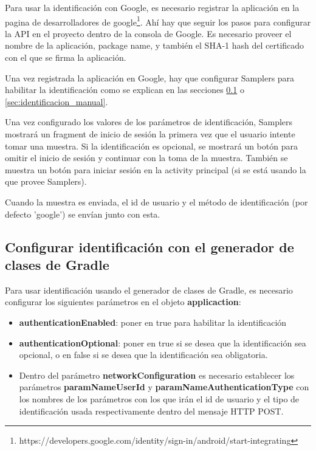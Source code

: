 Para usar la identificación con Google, es necesario registrar la aplicación en la pagina de desarrolladores de google\footnote{https://developers.google.com/identity/sign-in/android/start-integrating}. Ahí hay que seguir los pasos para configurar la API en el proyecto dentro de la consola de Google. Es necesario proveer el nombre de la aplicación, package name, y también el SHA-1 hash del certificado con el que se firma la aplicación.

Una vez registrada la aplicación en Google, hay que configurar Samplers para habilitar la identificación como se explican en las secciones \ref{sec:identificacion_gradle} o \ref{sec:identificacion_manual}.

Una vez configurado los valores de los parámetros de identificación, Samplers mostrará un fragment de inicio de sesión la primera vez que el usuario intente tomar una muestra. Si la identificación es opcional, se mostrará un botón para omitir el inicio de sesión y continuar con la toma de la muestra. También se muestra un botón para iniciar sesión en la activity principal (si se está usando la que provee Samplers).

Cuando la muestra es enviada, el id de usuario y el método de identificación (por defecto 'google') se envían junto con esta.


\subsection{Configurar identificación con el generador de clases de Gradle} \label{sec:identificacion_gradle}

Para usar identificación usando el generador de clases de Gradle, es necesario configurar los siguientes parámetros en el objeto \textbf{applicaction}:

\begin{itemize}

	\item \textbf{authenticationEnabled}: poner en true para habilitar la identificación
		
	\item \textbf{authenticationOptional}: poner en true si se desea que la identificación sea opcional, o en false si se desea que la identificación sea obligatoria.
	
	\item Dentro del parámetro \textbf{networkConfiguration} es necesario establecer los parámetros \textbf{paramNameUserId} y \textbf{paramNameAuthenticationType} con los nombres de los parámetros con los que irán el id de usuario y el tipo de identificación usada respectivamente dentro del mensaje HTTP POST.
	

\end{itemize}

